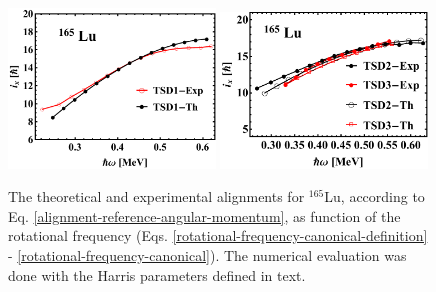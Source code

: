 \begin{figure}
    \centering
    \includegraphics[width=0.49\textwidth]{Chapters/Figures/Lu-exp-energies/fig9a_lu165.pdf}
    \includegraphics[width=0.49\textwidth]{Chapters/Figures/Lu-exp-energies/fig9b_lu165.pdf}
    \caption{The theoretical and experimental alignments for $^{165}$Lu, according to Eq. \ref{alignment-reference-angular-momentum}, as function of the rotational frequency (Eqs. \ref{rotational-frequency-canonical-definition} - \ref{rotational-frequency-canonical}). The numerical evaluation was done with the Harris parameters defined in text.}
    \label{alignments-lu-165}
\end{figure}
